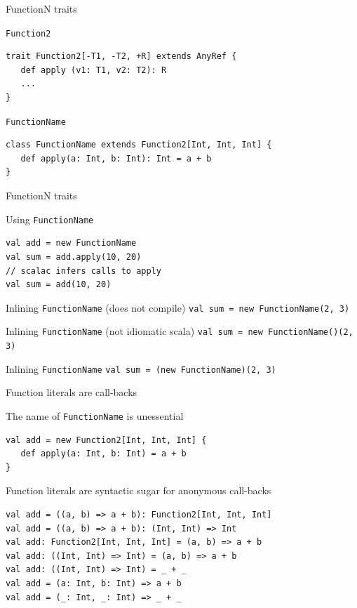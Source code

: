 \begin{frame}[fragile]{FunctionN traits}
\begin{block}{\lstinline!Function2!}
\begin{lstlisting}
trait Function2[-T1, -T2, +R] extends AnyRef {
   def apply (v1: T1, v2: T2): R 
   ...
}
\end{lstlisting}
\end{block}
\pause
\begin{exampleblock}{\lstinline!FunctionName!}
\begin{lstlisting}
class FunctionName extends Function2[Int, Int, Int] {
   def apply(a: Int, b: Int): Int = a + b
} 
\end{lstlisting}
\end{exampleblock}
\end{frame}

\begin{frame}[fragile]{FunctionN traits}
\begin{exampleblock}{Using \lstinline!FunctionName!}
\begin{lstlisting}
val add = new FunctionName
val sum = add.apply(10, 20)
// scalac infers calls to apply
val sum = add(10, 20)
\end{lstlisting}
\end{exampleblock}
\pause
\begin{alertblock}{Inlining \lstinline!FunctionName! (does not compile)}
\lstinline!val sum = new FunctionName(2, 3)!
\end{alertblock}
\pause
\begin{block}{Inlining \lstinline!FunctionName! (not idiomatic scala)}
\lstinline!val sum = new FunctionName()(2, 3)!
\end{block}
\pause
\begin{exampleblock}{Inlining \lstinline!FunctionName!}
\lstinline!val sum = (new FunctionName)(2, 3)!
\end{exampleblock}
\end{frame}

\begin{frame}[fragile]{Function literals are call-backs}
\begin{block}{The name of \lstinline!FunctionName! is unessential}
\begin{lstlisting}
val add = new Function2[Int, Int, Int] {
   def apply(a: Int, b: Int) = a + b
} 
\end{lstlisting}
\end{block}
\pause
\begin{exampleblock}{Function literals are syntactic sugar for anonymous
call-backs}
\begin{lstlisting}
val add = ((a, b) => a + b): Function2[Int, Int, Int]
val add = ((a, b) => a + b): (Int, Int) => Int
val add: Function2[Int, Int, Int] = (a, b) => a + b
val add: ((Int, Int) => Int) = (a, b) => a + b
val add: ((Int, Int) => Int) = _ + _
val add = (a: Int, b: Int) => a + b
val add = (_: Int, _: Int) => _ + _
\end{lstlisting}
\end{exampleblock}
\end{frame}


